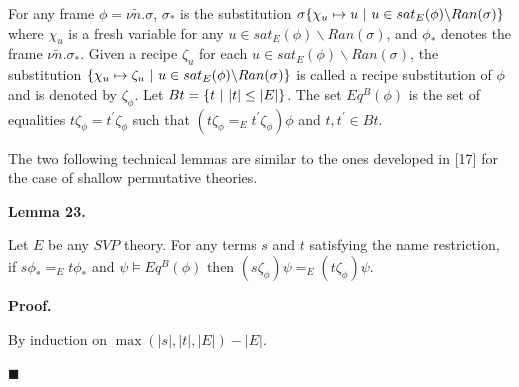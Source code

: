 For any frame $\phi=\nu\tilde{n}.\sigma$, $\sigma_{*}$ is the substitution $\sigma\{\chi_{u}\mapsto u\leavevmode\nobreak\ |\leavevmode\nobreak\ u\in sat_{%
E}(\phi)\backslash Ran(\sigma)\}$ where $\chi_{u}$ is a fresh variable for any $u\in sat_{E}(\phi)\backslash Ran(\sigma)$, and $\phi_{*}$ denotes the frame $\nu\tilde{n}.\sigma_{*}$. Given a recipe $\zeta_{u}$ for each $u\in sat_{E}(\phi)\backslash Ran(\sigma)$, the substitution $\{\chi_{u}\mapsto\zeta_{u}\leavevmode\nobreak\ |\leavevmode\nobreak\ u\in sat_%
{E}(\phi)\backslash Ran(\sigma)\}$ is called a recipe substitution of $\phi$ and is denoted by $\zeta_{\phi}$. Let $Bt=\{t\leavevmode\nobreak\ |\leavevmode\nobreak\ |t|\leq|E|\}$. The set $Eq^{B}(\phi)$ is the set of equalities $t\zeta_{\phi}=t^{\prime}\zeta_{\phi}$ such that $(t\zeta_{\phi}=_{E}t^{\prime}\zeta_{\phi})\phi$ and $t,t^{\prime}\in Bt$.\par
 
 
 
 
The two following technical lemmas are similar to the ones developed in [17] for the case of shallow permutative theories.\par
 
 
 
\par\medskip\noindent\textbf{Lemma 23.}\par
 
 
Let $E$ be any $\mathit{SVP}$ theory. For any terms $s$ and $t$ satisfying the name restriction, if $s\phi_{*}=_{E}t\phi_{*}$ and $\psi\models Eq^{B}(\phi)$ then $(s\zeta_{\phi})\psi=_{E}(t\zeta_{\phi})\psi$.\par
 
 
 
 
\par\medskip\noindent\textbf{Proof.}\par
 
 
By induction on $\max(|s|,|t|,|E|)-|E|$.\par
  
\par\noindent  $\blacksquare$ 
 
